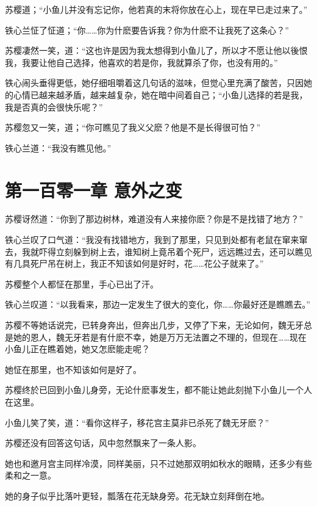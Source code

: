 \documentclass[12pt,oneside]{book}
\begin{document}
苏樱道；``小鱼儿并没有忘记你，他若真的末将你放在心上，现在早已走过来了。''

铁心兰怔了怔道；``你\ldots\ldots 你为什麽要告诉我？你为什麽不让我死了这条心？''

苏樱凄然一笑，道：``这也许是因为我太想得到小鱼儿了，所以才不愿让他以後恨我，我要让他自己选择，他喜欢的若是你，我就算杀了你，也没有用的。''

铁心闹头垂得更低，她仔细咀嚼着这几句话的滋味，但觉心里充满了酸苦，只因她的心情已越来越矛盾，越来越复杂，她在暗中间着自己；``小鱼儿选择的若是我，我是否真的会很快乐呢？''

苏樱忽又一笑，道；``你可瞧见了我义父麽？他是不是长得很可怕？''

铁心兰道：``我没有瞧见他。''

\hypertarget{ux7b2cux4e00ux767eux96f6ux4e00ux7ae0-ux610fux5916ux4e4bux53d8}{%
\chapter{第一百零一章
意外之变}\label{ux7b2cux4e00ux767eux96f6ux4e00ux7ae0-ux610fux5916ux4e4bux53d8}}

苏樱讶然道：``你到了那边树林，难道没有人来接你麽？你是不是找错了地方？''

铁心兰叹了口气道：``我没有找错地方，我到了那里，只见到处都有老鼠在窜来窜去，我就吓得立刻躲到树上去，谁知树上竟吊着个死尸，远远瞧过去，还可以瞧见有几具死尸吊在树上，我正不知该如何是好时，花\ldots\ldots 花公子就来了。''

苏樱整个人都怔在那里，手心已出了汗。

铁心兰叹道：``以我看来，那边一定发生了很大的变化，你\ldots\ldots 你最好还是瞧瞧去。''

苏樱不等她话说完，已转身奔出，但奔出几步，又停了下来，无论如何，魏无牙总是她的恩人，魏无牙若是有什麽不幸，她是万万无法置之不理的，但现在\ldots\ldots 现在小鱼儿正在瞧着她，她又怎麽能走呢？

她怔在那里，也不知该如何是好了。

苏樱终於已回到小鱼儿身旁，无论什麽事发生，都不能让她此刻抛下小鱼儿一个人在这里。

小鱼儿笑了笑，道：``看你这样子，移花宫主莫非已杀死了魏无牙麽？''

苏樱还没有回答这句话，风中忽然飘来了一条人影。

她也和邀月宫主同样冷漠，同样美丽，只不过她那双明如秋水的眼睛，还多少有些柔和之一意。

她的身子似乎比落叶更轻，瓢落在花无缺身旁。花无缺立刻拜倒在地。
\end{document}
